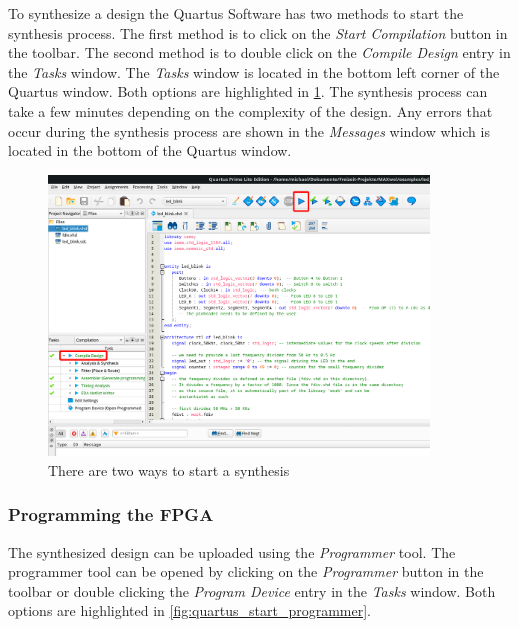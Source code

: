 To synthesize a design the Quartus Software has two methods to start the synthesis process. The first method is to click on the \textit{Start Compilation} button in the toolbar. The second method is to double click on the \textit{Compile Design} entry in the \textit{Tasks} window. The \textit{Tasks} window is located in the bottom left corner of the Quartus window. Both options are highlighted in \cref{fig:quartus_start_synthesis}. The synthesis process can take a few minutes depending on the complexity of the design. Any errors that occur during the synthesis process are shown in the \textit{Messages} window which is located in the bottom of the Quartus window.

\begin{figure}[h!]
	\centering
	\includegraphics[width=0.9\textwidth]{fig/quartus_start_synthesis.png}
	\caption{There are two ways to start a synthesis}
	\label{fig:quartus_start_synthesis}
\end{figure}

\subsubsection{Programming the FPGA}

The synthesized design can be uploaded using the \textit{Programmer} tool. The programmer tool can be opened by clicking on the \textit{Programmer} button in the toolbar or double clicking the \textit{Program Device} entry in the \textit{Tasks} window. Both options are highlighted in \cref{fig:quartus_start_programmer}.

